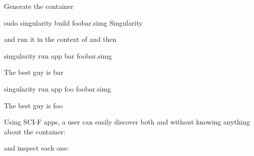 \documentclass[letterpaper,10pt,english]{sphinxmanual}
\begin{document}
Generate the container

%
\begin{sphinxVerbatim}[commandchars=\\\{\}]
\PYGZdl{} sudo singularity build foobar.simg Singularity
\end{sphinxVerbatim}

and run it in the context of  and then 

%
\begin{sphinxVerbatim}[commandchars=\\\{\}]
\PYGZdl{} singularity run \PYGZhy{}\PYGZhy{}app bar foobar.simg

The best guy is bar

\PYGZdl{} singularity run \PYGZhy{}\PYGZhy{}app foo foobar.simg

The best guy is foo
\end{sphinxVerbatim}

Using SCI-F apps, a user can easily discover both  and  without knowing
anything about the container:

%
\begin{sphinxVerbatim}[commandchars=\\\{\}]
  


\end{sphinxVerbatim}

\begin{DUlineblock}{0em}
\item[] and inspect each one:
\end{DUlineblock}

%
\begin{sphinxVerbatim}[commandchars=\\\{\}]
     


     

     

\end{sphinxVerbatim}
\end{document}
